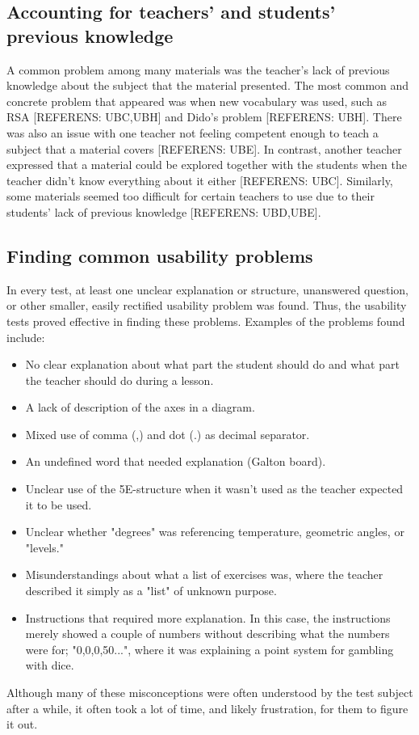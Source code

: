 \subsection{Accounting for teachers' and students' previous knowledge}
A common problem among many materials was the teacher's lack of previous knowledge about the subject that the material presented. The most common and concrete problem that appeared was when new vocabulary was used, such as RSA [REFERENS: UBC,UBH] and Dido's problem [REFERENS: UBH]. There was also an issue with one teacher not feeling competent enough to teach a subject that a material covers [REFERENS: UBE]. In contrast, another teacher expressed that a material could be explored together with the students when the teacher didn't know everything about it either [REFERENS: UBC]. Similarly, some materials seemed too difficult for certain teachers to use due to their students' lack of previous knowledge [REFERENS: UBD,UBE].

\subsection{Finding common usability problems}
In every test, at least one unclear explanation or structure, unanswered question, or other smaller, easily rectified usability problem was found. Thus, the usability tests proved effective in finding these problems. Examples of the problems found include:
\begin{itemize}
	\item No clear explanation about what part the student should do and what part the teacher should do during a lesson.
	\item A lack of description of the axes in a diagram.
	\item Mixed use of comma (,) and dot (.) as decimal separator.
	\item An undefined word that needed explanation (Galton board).
	\item Unclear use of the 5E-structure when it wasn't used as the teacher expected it to be used.
	\item Unclear whether "degrees" was referencing temperature, geometric angles, or "levels."
	\item Misunderstandings about what a list of exercises was, where the teacher described it simply as a "list" of unknown purpose.
	\item Instructions that required more explanation. In this case, the instructions merely showed a couple of numbers without describing what the numbers were for; "0,0,0,50...", where it was explaining a point system for gambling with dice.
\end{itemize}

Although many of these misconceptions were often understood by the test subject after a while, it often took a lot of time, and likely frustration, for them to figure it out.
